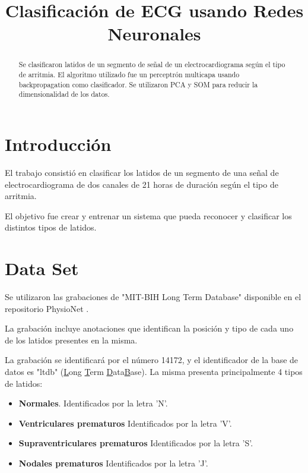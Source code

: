 \documentclass[conference]{IEEEtran}
\theoremstyle{definition}
\begin{document}
\title{Clasificaci\'{o}n de ECG usando Redes Neuronales}

\author{
	}
\maketitle


\begin{abstract}
	Se clasificaron latidos de un segmento de se\~{n}al de un electrocardiograma seg\'{u}n el tipo de arritmia. El algoritmo utilizado fue un perceptr\'{o}n multicapa usando backpropagation como clasificador. Se utilizaron PCA y SOM para reducir la dimensionalidad de los datos.
\end{abstract}

\section{Introducci\'{o}n}

El trabajo consisti\'{o} en clasificar los latidos de un segmento de una se\~{n}al de electrocardiograma de dos canales de 21 horas de duraci\'{o}n seg\'{u}n el tipo de arritmia.

El objetivo fue crear y entrenar un sistema que pueda reconocer y clasificar los distintos tipos de latidos.

\section{Data Set}

Se utilizaron las grabaciones de "MIT-BIH Long Term Database" \cite{MIT-BIH} disponible en el repositorio PhysioNet \cite{PHYSIONET}.

La grabaci\'{o}n incluye anotaciones que identifican la posici\'{o}n y tipo de cada uno de los latidos presentes en la misma.

La grabaci\'{o}n se identificar\'{a} por el n\'{u}mero 14172, y el identificador de la base de datos es "ltdb" (\underline{L}ong \underline{T}erm \underline{D}ata\underline{B}ase).
La misma presenta principalmente 4 tipos de latidos:

\begin{itemize}
	\item \textbf{Normales}. Identificados por la letra 'N'.
	\item \textbf{Ventriculares prematuros} Identificados por la letra 'V'.
	\item \textbf{Supraventriculares prematuros} Identificados por la letra 'S'.
	\item \textbf{Nodales prematuros} Identificados por la letra 'J'.
\end{itemize}
\end{document}
